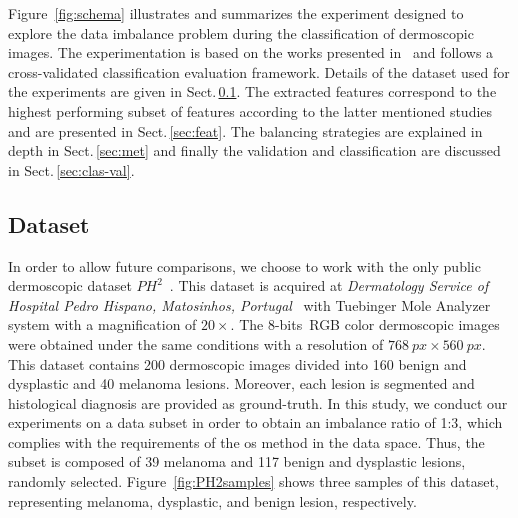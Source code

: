 \noindent Figure~\ref{fig:schema} illustrates and summarizes the experiment designed to explore the data imbalance problem during the classification of dermoscopic images.
The experimentation is based on the works presented in~\cite{rastgoo2015automatic, rastgoo2015ensemble} and follows a cross-validated classification evaluation framework.
Details of the dataset used for the experiments are given in Sect.\,\ref{sec:dataset}. 
The extracted features correspond to the highest performing subset of features according to the latter mentioned studies and are presented in Sect.\,\ref{sec:feat}.
The balancing strategies are explained in depth in Sect.\,\ref{sec:met} and finally the validation and classification are discussed in Sect.\,\ref{sec:clas-val}.

\subsection{Dataset}\label{sec:dataset}
In order to allow future comparisons, we choose to work with the only public dermoscopic dataset $PH^{2}$~\cite{barata2013two}.
This dataset is acquired at \textit{Dermatology Service of Hospital Pedro Hispano, Matosinhos, Portugal}~\cite{barata2013two} with Tuebinger Mole Analyzer system with a magnification of $20 \times$.
The 8-bits~RGB color dermoscopic images were obtained under the same conditions with a resolution of $\SI{768}{px} \times \SI{560}{px}$. 
This dataset contains 200 dermoscopic images divided into 160 benign and dysplastic and 40 melanoma lesions. 
Moreover, each lesion is segmented and histological diagnosis are provided as ground-truth. 
In this study, we conduct our experiments on a data subset in order to obtain an imbalance ratio of 1:3, which complies with the requirements of the \ac{os} method in the data space.
Thus, the subset is composed of 39 melanoma and 117 benign and dysplastic lesions, randomly selected. 
Figure~\ref{fig:PH2samples} shows three samples of this dataset, representing melanoma, dysplastic, and benign lesion, respectively. 

